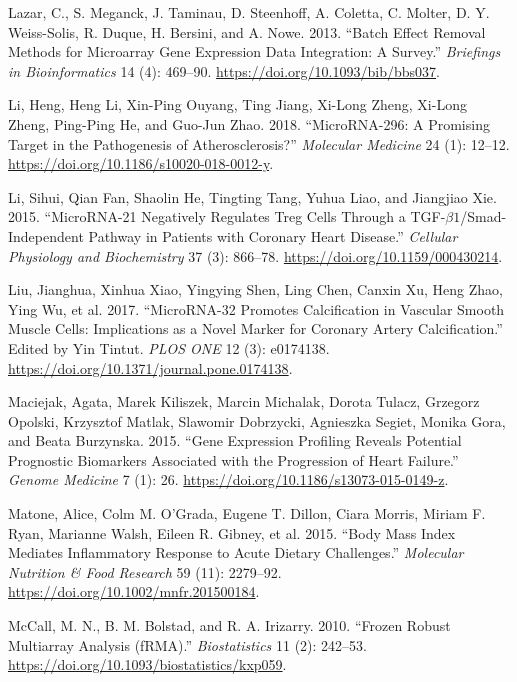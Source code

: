 \documentclass[
]{article}
\newlength{\cslhangindent}
\newlength{\cslentryspacingunit} %
\newenvironment{CSLReferences}[2] %
 {%
  \setlength{\parindent}{0pt}
  \ifodd #1
  \let\oldpar\par
  \def\par{\hangindent=\cslhangindent\oldpar}
  \fi
  \setlength{\parskip}{#2\cslentryspacingunit}
 }%
 {}
\begin{document}
\begin{CSLReferences}{1}{0}
\leavevmode{}%
Lazar, C., S. Meganck, J. Taminau, D. Steenhoff, A. Coletta, C. Molter,
D. Y. Weiss-Solis, R. Duque, H. Bersini, and A. Nowe. 2013. {``Batch
Effect Removal Methods for Microarray Gene Expression Data Integration:
A Survey.''} \emph{Briefings in Bioinformatics} 14 (4): 469--90.
\url{https://doi.org/10.1093/bib/bbs037}.

\leavevmode{}%
Li, Heng, Heng Li, Xin-Ping Ouyang, Ting Jiang, Xi-Long Zheng, Xi-Long
Zheng, Ping-Ping He, and Guo-Jun Zhao. 2018. {``{MicroRNA}-296: A
Promising Target in the Pathogenesis of Atherosclerosis?''}
\emph{Molecular Medicine} 24 (1): 12--12.
\url{https://doi.org/10.1186/s10020-018-0012-y}.

\leavevmode{}%
Li, Sihui, Qian Fan, Shaolin He, Tingting Tang, Yuhua Liao, and
Jiangjiao Xie. 2015. {``{MicroRNA}-21 {Negatively} {Regulates} {Treg}
{Cells} {Through} a {TGF}-\(\beta1\)/{Smad}-{Independent} {Pathway} in
{Patients} with {Coronary} {Heart} {Disease}.''} \emph{Cellular
Physiology and Biochemistry} 37 (3): 866--78.
\url{https://doi.org/10.1159/000430214}.

\leavevmode{}%
Liu, Jianghua, Xinhua Xiao, Yingying Shen, Ling Chen, Canxin Xu, Heng
Zhao, Ying Wu, et al. 2017. {``{MicroRNA}-32 Promotes Calcification in
Vascular Smooth Muscle Cells: {Implications} as a Novel Marker for
Coronary Artery Calcification.''} Edited by Yin Tintut. \emph{PLOS ONE}
12 (3): e0174138. \url{https://doi.org/10.1371/journal.pone.0174138}.

\leavevmode{}%
Maciejak, Agata, Marek Kiliszek, Marcin Michalak, Dorota Tulacz,
Grzegorz Opolski, Krzysztof Matlak, Slawomir Dobrzycki, Agnieszka
Segiet, Monika Gora, and Beata Burzynska. 2015. {``Gene Expression
Profiling Reveals Potential Prognostic Biomarkers Associated with the
Progression of Heart Failure.''} \emph{Genome Medicine} 7 (1): 26.
\url{https://doi.org/10.1186/s13073-015-0149-z}.

\leavevmode{}%
Matone, Alice, Colm M. O'Grada, Eugene T. Dillon, Ciara Morris, Miriam
F. Ryan, Marianne Walsh, Eileen R. Gibney, et al. 2015. {``Body Mass
Index Mediates Inflammatory Response to Acute Dietary Challenges.''}
\emph{Molecular Nutrition \& Food Research} 59 (11): 2279--92.
\url{https://doi.org/10.1002/mnfr.201500184}.

\leavevmode{}%
McCall, M. N., B. M. Bolstad, and R. A. Irizarry. 2010. {``Frozen Robust
Multiarray Analysis ({fRMA}).''} \emph{Biostatistics} 11 (2): 242--53.
\url{https://doi.org/10.1093/biostatistics/kxp059}.


\end{CSLReferences}
\end{document}
